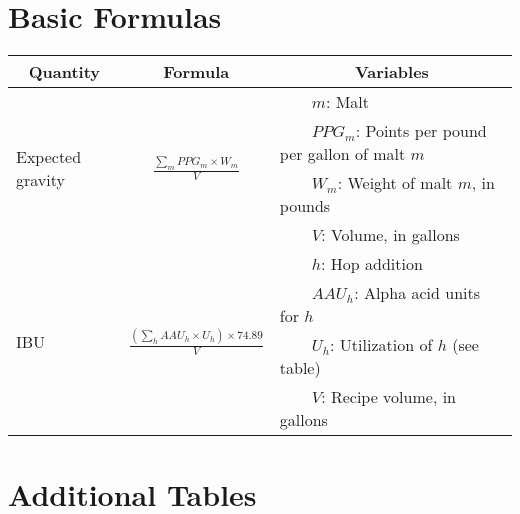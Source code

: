 \documentclass{article}
\newcommand{\tabitem}{~~\llap{\textbullet}~~}
\begin{document}
\section*{Basic Formulas}


\begin{tabular}{l|c|l}
	\multicolumn{1}{c|}{Quantity} & Formula & \multicolumn{1}{|c}{Variables}\\ \hline
	\multirow{4}{*}{Expected gravity} & \multirow{4}{*}{$\frac{\sum_{m} PPG_m\times W_m}{V}$} & \tabitem $m$: Malt\\
	& & \tabitem $PPG_m$: Points per pound per gallon of malt $m$\\
	& & \tabitem $W_m$: Weight of malt $m$, in pounds\\
	& & \tabitem $V$: Volume, in gallons\\ \hline
	\multirow{4}{*}{IBU} & \multirow{4}{*}{$\frac{\left(\sum_h AAU_h\times U_h\right)\times 74.89}{V}$} & \tabitem $h$: Hop addition\\
	& & \tabitem $AAU_h$: Alpha acid units for $h$\\
	& & \tabitem $U_h$: Utilization of $h$ (see table)\\
	& & \tabitem $V$: Recipe volume, in gallons\\
	\hline\hline
\end{tabular}

\section*{Additional Tables}


\end{document}
